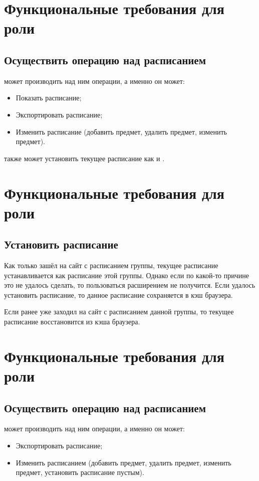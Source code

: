 	\section{Функциональные требования для роли }
		\subsection{Осуществить операцию над расписанием}
			 может производить над ним операции, а именно он может:
			\begin{itemize}
				\item Показать расписание;
				
				\item Экспортировать расписание;
				
				\item Изменить расписание (добавить предмет, удалить предмет, изменить предмет).
			\end{itemize}
			
			 также может установить текущее расписание как и .
	\section{Функциональные требования для роли }
		\subsection{Установить расписание}
			Как только  зашёл на сайт с расписанием группы, текущее расписание устанавливается как расписание этой группы. Однако если по какой-то причине это не удалось сделать, то пользоваться расширением не получится. Если удалось установить расписание, то данное расписание сохраняется в кэш браузера.
			
			Если  ранее уже заходил на сайт с расписанием данной группы, то текущее расписание восстановится из кэша браузера.
	\section{Функциональные требования для роли }
		\subsection{Осуществить операцию над расписанием}
			 может производить над ним операции, а именно он может:
			\begin{itemize}
				\item Экспортировать расписание;
					
				\item Изменить расписанием (добавить предмет, удалить предмет, изменить предмет, установить расписание пустым).
			\end{itemize}
			
